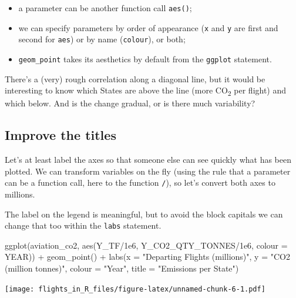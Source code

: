 \documentclass[
]{book}
\newenvironment{Shaded}{\begin{snugshade}}{\end{snugshade}}
\newcommand{\AttributeTok}[1]{\textcolor[rgb]{0.77,0.63,0.00}{#1}}
\newcommand{\FloatTok}[1]{\textcolor[rgb]{0.00,0.00,0.81}{#1}}
\newcommand{\FunctionTok}[1]{\textcolor[rgb]{0.00,0.00,0.00}{#1}}
\newcommand{\NormalTok}[1]{#1}
\newcommand{\SpecialCharTok}[1]{\textcolor[rgb]{0.00,0.00,0.00}{#1}}
\newcommand{\StringTok}[1]{\textcolor[rgb]{0.31,0.60,0.02}{#1}}
\providecommand{\tightlist}{%
  \setlength{\itemsep}{0pt}\setlength{\parskip}{0pt}}
\begin{document}
\begin{itemize}
\tightlist
\item
  a parameter can be another function call \texttt{aes()};
\item
  we can specify parameters by order of appearance (\texttt{x} and \texttt{y} are first and second for \texttt{aes}) or by name (\texttt{colour}), or both;
\item
  \texttt{geom\_point} takes its aesthetics by default from the \texttt{ggplot} statement.
\end{itemize}

There's a (very) rough correlation along a diagonal line, but it would be interesting to know which States are above the line (more CO\textsubscript{2} per flight) and which below. And is the change gradual, or is there much variability?

\hypertarget{improve-the-titles}{%
\subsection{Improve the titles}\label{improve-the-titles}}

Let's at least label the axes so that someone else can see quickly what has been plotted. We can transform variables on the fly (using the rule that a parameter can be a function call, here to the function \texttt{/}), so let's convert both axes to millions.

The label on the legend is meaningful, but to avoid the block capitals we can change that too within the \texttt{labs} statement.

\begin{Shaded}
\begin{Highlighting}[]
\FunctionTok{ggplot}\NormalTok{(aviation\_co2, }\FunctionTok{aes}\NormalTok{(Y\_TF}\SpecialCharTok{/}\FloatTok{1e6}\NormalTok{, Y\_CO2\_QTY\_TONNES}\SpecialCharTok{/}\FloatTok{1e6}\NormalTok{, }\AttributeTok{colour =}\NormalTok{ YEAR)) }\SpecialCharTok{+}
  \FunctionTok{geom\_point}\NormalTok{() }\SpecialCharTok{+} 
  \FunctionTok{labs}\NormalTok{(}\AttributeTok{x =} \StringTok{"Departing Flights (millions)"}\NormalTok{, }
       \AttributeTok{y =} \StringTok{"CO2 (million tonnes)"}\NormalTok{,}
       \AttributeTok{colour =} \StringTok{"Year"}\NormalTok{,}
       \AttributeTok{title =} \StringTok{"Emissions per State"}\NormalTok{)}
\end{Highlighting}
\end{Shaded}

\texttt{[image: flights\_in\_R\_files/figure-latex/unnamed-chunk-6-1.pdf]}
\end{document}
